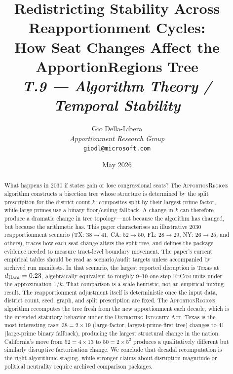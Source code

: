 \documentclass[12pt]{article}
\title{%
  \textbf{Redistricting Stability Across Reapportionment Cycles:}\\
  \textbf{How Seat Changes Affect the ApportionRegions Tree}\\[0.8em]
  \normalsize\textit{T.9 --- Algorithm Theory / Temporal Stability}%
}
\author{%
  Gio Della-Libera\\
  \textit{Apportionment Research Group}\\
  \small\texttt{giodl@microsoft.com}
}
\date{May 2026}
\newcommand{\ar}{\textsc{ApportionRegions}}
\newcommand{\dia}{\textsc{Districting Integrity Act}}
\newcommand{\recom}{\textsc{ReCom}}
\begin{document}
\maketitle

\begin{abstract}
\noindent
What happens in 2030 if states gain or lose congressional seats?
The \ar{} algorithm constructs a bisection tree whose structure is
determined by the split prescription for the district count $k$: composites
split by their largest prime factor, while large primes use a binary
floor/ceiling fallback.
A change in $k$ can therefore produce a dramatic change in tree
topology---not because the algorithm has changed, but because the
arithmetic has.
This paper characterises an illustrative 2030 reapportionment scenario
(TX: $38 \to 41$, CA: $52 \to 50$, FL: $28 \to 29$, NY: $26 \to 25$,
and others), traces how each seat change alters the split tree, and
defines the package evidence needed to measure tract-level boundary
movement.
The paper's current empirical tables should be read as scenario/audit
targets unless accompanied by archived run manifests.
In that scenario, the largest reported disruption is Texas at
$d_{\rm Ham}=0.23$, algebraically equivalent to roughly 9--10 one-step
\recom{} units under the approximation $1/k$.
That comparison is a scale heuristic, not an empirical mixing result.
The reapportionment adjustment itself is deterministic once the input
data, district count, seed, graph, and split prescription are fixed.
The \ar{} algorithm recomputes the tree fresh from the new
apportionment each decade, which is the intended statutory
behavior under the \dia{}.
Texas is the most interesting case: $38 = 2 \times 19$ (large-factor,
largest-prime-first tree) changes to $41$ (large-prime binary fallback),
producing
the largest structural change in the nation.
California's move from $52 = 4 \times 13$ to $50 = 2 \times 5^2$
produces a qualitatively different but similarly disruptive
factorisation change.
We conclude that decadal recomputation is the right algorithmic staging,
while stronger claims about disruption magnitude or political neutrality
require archived comparison packages.
\end{abstract}

\tableofcontents
\newpage











\end{document}
